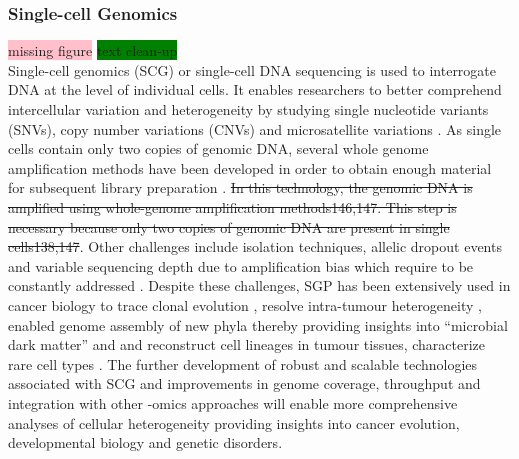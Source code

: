 \subsubsection{Single-cell Genomics}
\colorbox{pink}{missing figure} \colorbox{green}{text clean-up}\\
	Single-cell genomics (SCG) or single-cell DNA sequencing is used to interrogate DNA at the level of individual cells. It enables researchers to better comprehend intercellular variation and heterogeneity by studying single nucleotide variants (SNVs), copy number variations (CNVs) and microsatellite variations \textbf{\cite{stein_single-cell_2021,luquette_identification_2019,mallory_methods_2020,woodworth_building_2017}}. As single cells contain only two copies of genomic DNA, several whole genome amplification methods have been developed in order to obtain enough material for subsequent library preparation \textbf{\cite{stein_single-cell_2021,gawad_single-cell_2016,kashima_single-cell_2020}}. \st{In this technology, the genomic DNA is amplified using whole-genome amplification methods146,147. This step is necessary because only two copies of genomic DNA are present in single cells138,147}. Other challenges include isolation techniques, allelic dropout events and variable sequencing depth due to amplification bias which require to be constantly addressed \textbf{\cite{stein_single-cell_2021,gawad_single-cell_2016,kashima_single-cell_2020}}. Despite these challenges, SGP has been extensively used in cancer biology to trace clonal evolution \textbf{\cite{stein_single-cell_2021,kashima_single-cell_2020}}, resolve intra-tumour heterogeneity \textbf{\cite{gawad_single-cell_2016}}, enabled genome assembly of new phyla thereby providing insights into “microbial dark matter” \textbf{\cite{gawad_single-cell_2016}}  and and reconstruct cell lineages in tumour tissues, characterize rare cell types \textbf{\cite{stein_single-cell_2021,liu_current_2017}}. The further development of robust and scalable technologies associated with SCG and improvements in genome coverage, throughput and integration with other -omics approaches will enable more comprehensive analyses of cellular heterogeneity providing insights into cancer evolution, developmental biology and genetic disorders.

